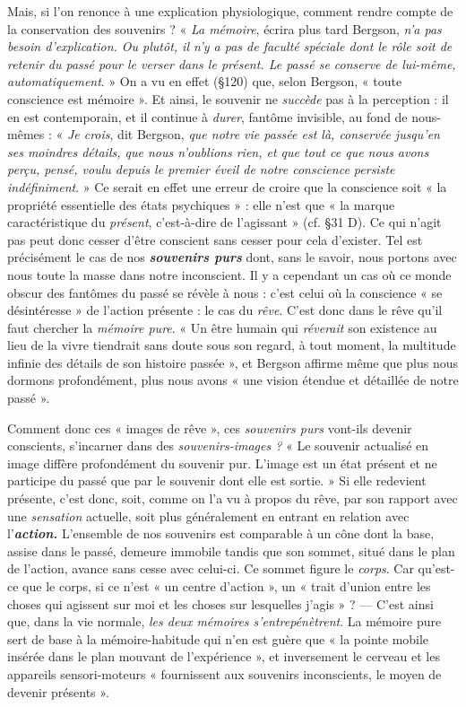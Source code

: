 Mais, si l’on renonce à une explication physiologique, comment
rendre compte de la conservation des souvenirs ? « {\it La mémoire}, écrira
plus tard Bergson, {\it n’a pas besoin d'explication. Ou plutôt, il n'y a
pas de faculté spéciale dont le rôle soit de retenir du passé pour le verser
dans le présent. Le passé se conserve de lui-même, automatiquement}. »
On a vu en effet (\S 120) que, selon Bergson, « toute conscience est
mémoire ». Et ainsi, le souvenir ne {\it succède} pas à la perception : il en
est contemporain, et il continue à {\it durer}, fantôme invisible, au fond
de nous-mêmes : « {\it Je crois}, dit Bergson, {\it que notre vie passée est là,
conservée jusqu'en ses moindres détails, que nous n'oublions rien, et
que tout ce que nous avons perçu, pensé, voulu depuis le premier éveil
de notre conscience persiste indéfiniment}. » Ce serait en effet une erreur
de croire que la conscience soit « la propriété essentielle des états
psychiques » : elle n’est que « la marque caractéristique du {\it présent},
c’est-à-dire de l’agissant » (cf. \S 31 D). Ce qui n’agit pas peut donc cesser
d’être conscient sans cesser pour cela d'exister. Tel est précisément le
cas de nos \textbf{\textit {souvenirs purs}} dont, sans le savoir, nous portons avec nous
toute la masse dans notre inconscient. Il y a cependant un cas où ce
monde obscur des fantômes du passé se révèle à nous : c’est celui où
la conscience « se désintéresse » de l’action présente : le cas du {\it rêve}.
C’est donc dans le rêve qu’il faut chercher la {\it mémoire pure}. « Un être
humain qui {\it réverait} son existence au lieu de la vivre tiendrait sans
doute sous son regard, à tout moment, la multitude infinie des
détails de son histoire passée », et Bergson affirme même que plus
nous dormons profondément, plus nous avons « une vision étendue
et détaillée de notre passé ».

Comment donc ces « images de rêve », ces {\it souvenirs purs} vont-ils
devenir conscients, s’incarner dans des {\it souvenirs-images ?} « Le souvenir
actualisé en image diffère profondément du souvenir pur. L'image
est un état présent et ne participe du passé que par le souvenir dont
elle est sortie. » Si elle redevient présente, c’est donc, soit, comme on
l'a vu à propos du rêve, par son rapport avec une {\it sensation} actuelle,
soit plus généralement en entrant en relation avec l’\textbf{\textit {action.}} L’ensemble
de nos souvenirs est comparable à un cône dont la base,
assise dans le passé, demeure immobile tandis que son sommet, situé
dans le plan de l’action, avance sans cesse avec celui-ci. Ce sommet
figure le {\it corps}. Car qu'est-ce que le corps, si ce n’est « un centre
d’action », un « trait d’union entre les choses qui agissent sur moi et
les choses sur lesquelles j’agis » ? — C’est ainsi que, dans la vie normale,
{\it les deux mémoires s’entrepénètrent}. La mémoire pure sert de
base à la mémoire-habitude qui n’en est guère que « la pointe mobile
insérée dans le plan mouvant de l’expérience », et inversement le
cerveau et les appareils sensori-moteurs « fournissent aux souvenirs
inconscients, le moyen de devenir présents ».

